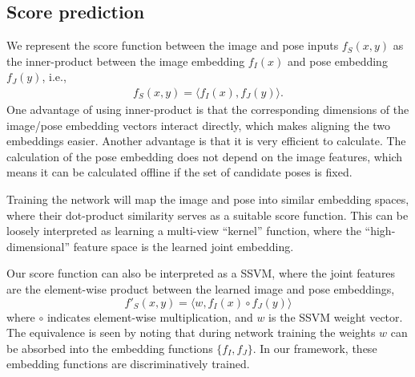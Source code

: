 \documentclass[10pt,twocolumn,letterpaper]{article}
\begin{document}
 


\subsection{Score prediction}
We represent the score function between the image and pose inputs $f_{S}(x,y)$ as the inner-product between the image embedding $f_{I}(x)$ and pose embedding $f_{J}(y)$, i.e., 
\begin{align}
f_{S}(x,y)  = \langle f_{I}(x), f_{J}(y) \rangle.
\end{align} 
One advantage of using inner-product is that the corresponding dimensions of the image/pose embedding vectors interact directly, which makes aligning the two embeddings easier.
Another advantage is that it is very efficient to calculate.
The calculation of the pose embedding does not depend on the image features, which means it can be calculated offline if the set of candidate poses is fixed. 


Training the network will map the image and pose into similar embedding spaces, where their dot-product similarity serves as a suitable score function. This can be loosely interpreted as learning a multi-view ``kernel'' function, where the ``high-dimensional'' feature space is the learned joint embedding.





Our score function can also be interpreted as a SSVM, where the joint features
are the element-wise product between the learned image and pose embeddings, 
\begin{equation}
  f'_{S}(x,y) = \langle w, f_{I}(x) \circ f_{J}(y) \rangle
\end{equation}
where $\circ$ indicates element-wise multiplication, and  $w$ is the SSVM weight vector.  
The equivalence is seen by noting that during network training the  weights $w$ can be absorbed into the embedding functions $\{f_I, f_J\}$.
In our framework, these embedding functions are discriminatively trained.
 
\end{document}
